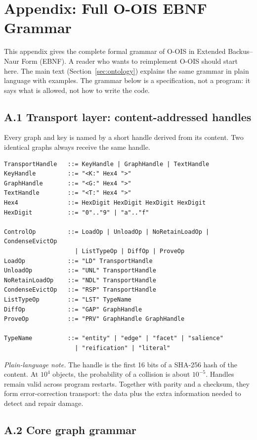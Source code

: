 \section*{Appendix: Full O-OIS EBNF Grammar}

This appendix gives the complete formal grammar of O-OIS in Extended Backus--Naur Form (EBNF). A reader who wants to reimplement O-OIS should start here. The main text (Section~\ref{sec:ontology}) explains the same grammar in plain language with examples. The grammar below is a specification, not a program: it says what is allowed, not how to write the code.

\subsection*{A.1 Transport layer: content-addressed handles}

Every graph and key is named by a short handle derived from its content. Two identical graphs always receive the same handle.

\begin{verbatim}
TransportHandle   ::= KeyHandle | GraphHandle | TextHandle
KeyHandle         ::= "<K:" Hex4 ">"
GraphHandle       ::= "<G:" Hex4 ">"
TextHandle        ::= "<T:" Hex4 ">"
Hex4              ::= HexDigit HexDigit HexDigit HexDigit
HexDigit          ::= "0".."9" | "a".."f"

ControlOp         ::= LoadOp | UnloadOp | NoRetainLoadOp | CondenseEvictOp
                    | ListTypeOp | DiffOp | ProveOp
LoadOp            ::= "LD" TransportHandle
UnloadOp          ::= "UNL" TransportHandle
NoRetainLoadOp    ::= "NDL" TransportHandle
CondenseEvictOp   ::= "RSP" TransportHandle
ListTypeOp        ::= "LST" TypeName
DiffOp            ::= "GAP" GraphHandle
ProveOp           ::= "PRV" GraphHandle GraphHandle

TypeName          ::= "entity" | "edge" | "facet" | "salience"
                    | "reification" | "literal"
\end{verbatim}

\textit{Plain-language note.} The handle is the first 16 bits of a SHA-256 hash of the content. At $10^4$ objects, the probability of a collision is about $10^{-5}$. Handles remain valid across program restarts. Together with parity and a checksum, they form error-correction transport: the data plus the extra information needed to detect and repair damage.

\subsection*{A.2 Core graph grammar}

